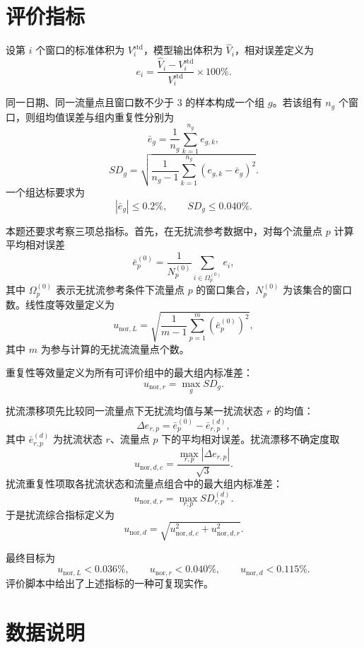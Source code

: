 \documentclass[UTF8,a4paper,11pt]{ctexart}
\begin{document}
\section*{评价指标}

设第 $i$ 个窗口的标准体积为 $V_i^{\mathrm{std}}$，模型输出体积为 $\hat V_i$，相对误差定义为
\[
e_i=\frac{\hat V_i-V_i^{\mathrm{std}}}{V_i^{\mathrm{std}}}\times 100\%.
\]

同一日期、同一流量点且窗口数不少于 3 的样本构成一个组 $g$。若该组有 $n_g$ 个窗口，则组均值误差与组内重复性分别为
\[
\bar e_g=\frac{1}{n_g}\sum_{k=1}^{n_g}e_{g,k},
\]
\[
SD_g=
\sqrt{
	\frac{1}{n_g-1}
	\sum_{k=1}^{n_g}(e_{g,k}-\bar e_g)^2
}.
\]
一个组达标要求为
\[
|\bar e_g|\le 0.2\%,\qquad SD_g\le 0.040\%.
\]

本题还要求考察三项总指标。首先，在无扰流参考数据中，对每个流量点 $p$ 计算平均相对误差
\[
\bar e_p^{(0)}=\frac{1}{N_p^{(0)}}\sum_{i\in\Omega_p^{(0)}} e_i,
\]
其中 $\Omega_p^{(0)}$ 表示无扰流参考条件下流量点 $p$ 的窗口集合，$N_p^{(0)}$ 为该集合的窗口数。线性度等效量定义为
\[
u_{\mathrm{nor},L}=
\sqrt{
	\frac{1}{m-1}
	\sum_{p=1}^{m}\left(\bar e_p^{(0)}\right)^2
},
\]
其中 $m$ 为参与计算的无扰流流量点个数。

重复性等效量定义为所有可评价组中的最大组内标准差：
\[
u_{\mathrm{nor},r}=\max_g SD_g.
\]

扰流漂移项先比较同一流量点下无扰流均值与某一扰流状态 $r$ 的均值：
\[
\Delta e_{r,p}=\bar e_p^{(0)}-\bar e_{r,p}^{(d)},
\]
其中 $\bar e_{r,p}^{(d)}$ 为扰流状态 $r$、流量点 $p$ 下的平均相对误差。扰流漂移不确定度取
\[
u_{\mathrm{nor},d,c}=\frac{\max_{r,p}|\Delta e_{r,p}|}{\sqrt{3}}.
\]
扰流重复性项取各扰流状态和流量点组合中的最大组内标准差：
\[
u_{\mathrm{nor},d,r}=\max_{r,p} SD_{r,p}^{(d)}.
\]
于是扰流综合指标定义为
\[
u_{\mathrm{nor},d}=
\sqrt{
	u_{\mathrm{nor},d,c}^2+
	u_{\mathrm{nor},d,r}^2
}.
\]

最终目标为
\[
u_{\mathrm{nor},L}<0.036\%,\qquad
u_{\mathrm{nor},r}<0.040\%,\qquad
u_{\mathrm{nor},d}<0.115\%.
\]
评价脚本中给出了上述指标的一种可复现实作。

\section*{数据说明}
\end{document}

